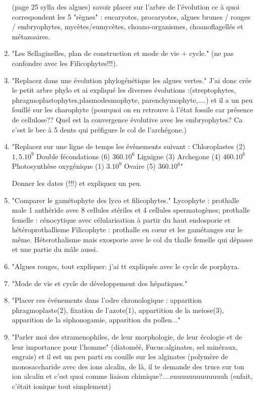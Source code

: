 \begin{enumerate}
(page 25 sylla des algues) savoir placer sur l'arbre de l'évolution ce à quoi correspondent les 5 "règnes" : eucaryotes, procaryotes, algues brunes / rouges / embryophytes, mycètes/eumycètes, choano-organismes, choanoflagellés et métazoaires.

	\item "Les Sellaginelles, plan de construction et mode de vie + cycle." (ne pas confondre avec les Filicophytes!!!).

	\item "Replacez dans une évolution phylogénétique les algues vertes." J'ai donc crée le petit arbre phylo et ai expliqué les diverses évolutions :(streptophytes, phragmoplastophytes,plasmodesmophyte, parenchymophyte,....) et il a un peu fouillé sur les charophyte (pourquoi on en retrouve à l'état fossile car présence de cellulose?? Quel est la convergence évolutive avec les embryophytes? Ca c'est le bec à 5 dents qui préfigure le col de l'archégone.)

	\item "Replacez sur une ligne de temps les évènements suivant :
Chloroplastes (2) $1,5.10^9$
Double fécondations (6) $360.10^6$
Lignigne (3)
Archegone (4) $460.10^6$
Photosynthèse oxygénique (1) $3 .10^9$
Ovaire (5) $360.10^6$"

Donner les dates (!!!) et expliquez un peu.

	\item "Comparer le gamétophyte des lyco et filicophytes."
Lycophyte : prothalle male 1 anthéride avec 8 cellules stériles et 4 cellules spermatogènes; prothalle femelle : cénocytique avec célularisation à partir du haut endosporie et hétéroprothallisme
Filicophyte : prothalle en cœur et les gamétanges sur le même. Héterothalisme mais exosporie avec le col du thalle femelle qui dépasse et une partie du mâle aussi.

	\item "Algues rouges, tout expliquer: j’ai tt expliquée avec le cycle de porphyra.

	\item "Mode de vie et cycle de développement des hépatiques."

	\item "Placer ces événements dans l'odre chronologique : apparition phragmoplaste(2), fixation de l'azote(1), appartition de la meiose(3), apparition de la siphonogamie, apparition du pollen..."


	\item "Parler moi des stramenophiles, de leur morphologie, de leur écologie et de leur importance pour l'homme" (diatoméé, Fucus:alginates, sel minéraux, engrais) et il est un peu parti en couille sur les alginates (polymère de monosaccharide avec des ions alcalin, de là, il te demande des trucs sur ton ion alcalin et c'est quoi comme liaison chimique?....euuuuuuuuuuuuuh (enfait, c'était ionique tout simplement)


\end{enumerate}
